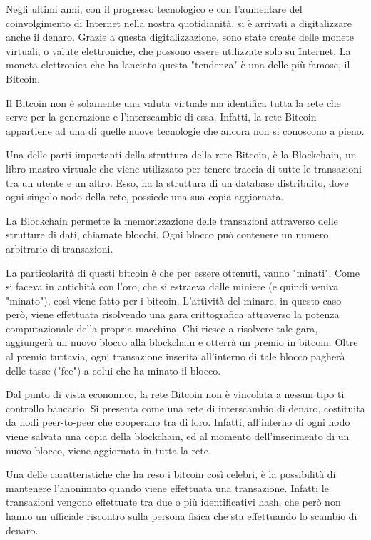 Negli ultimi anni, con il progresso tecnologico e con l'aumentare del coinvolgimento di Internet nella nostra quotidianità, si è arrivati a digitalizzare anche il denaro. Grazie a questa digitalizzazione, sono state create delle monete virtuali, o valute elettroniche, che possono essere utilizzate solo su Internet. La moneta elettronica che ha lanciato questa "tendenza" è una delle più famose, il Bitcoin.

Il Bitcoin non è solamente una valuta virtuale ma identifica tutta la rete che serve per la generazione e l'interscambio di essa. Infatti, la rete Bitcoin appartiene ad una di quelle nuove tecnologie che ancora non si conoscono a pieno. 

Una delle parti importanti della struttura della rete Bitcoin, è la Blockchain, un libro mastro virtuale che viene utilizzato per tenere traccia di tutte le transazioni tra un utente e un altro. Esso, ha la struttura di un database distribuito, dove ogni singolo nodo della rete, possiede una sua copia aggiornata. 

La Blockchain permette la memorizzazione delle transazioni attraverso delle strutture di dati, chiamate blocchi. Ogni blocco può contenere un numero arbitrario di transazioni. 

La particolarità di questi bitcoin è che per essere ottenuti, vanno "minati". Come si faceva in antichità con l'oro, che si estraeva dalle miniere (e quindi veniva "minato"), così viene fatto per i bitcoin. L'attività del minare, in questo caso però, viene effettuata risolvendo una gara crittografica attraverso la potenza computazionale della propria macchina. Chi riesce a risolvere tale gara, aggiungerà un nuovo blocco alla blockchain e otterrà un premio in bitcoin. Oltre al premio tuttavia, ogni transazione inserita all'interno di tale blocco pagherà delle tasse ("fee") a colui che ha minato il blocco.

Dal punto di vista economico, la rete Bitcoin non è vincolata a nessun tipo ti controllo bancario. Si presenta come una rete di interscambio di denaro, costituita da nodi peer-to-peer che cooperano tra di loro. Infatti, all'interno di ogni nodo viene salvata una copia della blockchain, ed al momento dell'inserimento di un nuovo blocco, viene aggiornata in tutta la rete.

Una delle caratteristiche che ha reso i bitcoin così celebri, è la possibilità di mantenere l'anonimato quando viene effettuata una transazione. Infatti le transazioni vengono effettuate tra due o più identificativi hash, che però non hanno un ufficiale riscontro sulla persona fisica che sta effettuando lo scambio di denaro.


